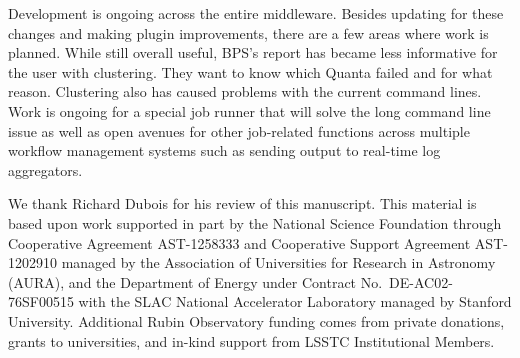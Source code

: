 \documentclass[11pt,twoside]{article}
\begin{document}
Development is ongoing across the entire middleware.  Besides updating
for these changes and making plugin improvements, there are a few areas
where work is planned.  While still overall useful, BPS's report has
became less informative for the user with clustering.  They want to know
which Quanta failed and for what reason.  Clustering also has caused
problems with the current command lines.  Work is ongoing for a special
job runner that will solve the long command line issue as well as open
avenues for other job-related functions across multiple workflow
management systems such as sending output to real-time log aggregators.

\acknowledgements We thank Richard Dubois for his review of this
manuscript.  This material is based upon work supported in part by the
National Science Foundation through Cooperative Agreement AST-1258333
and Cooperative Support Agreement AST-1202910 managed by the Association
of Universities for Research in Astronomy (AURA), and the Department
of Energy under Contract No.\ DE-AC02-76SF00515 with the SLAC National
Accelerator Laboratory managed by Stanford University. Additional Rubin
Observatory funding comes from private donations, grants to universities,
and in-kind support from LSSTC Institutional Members.





\end{document}
